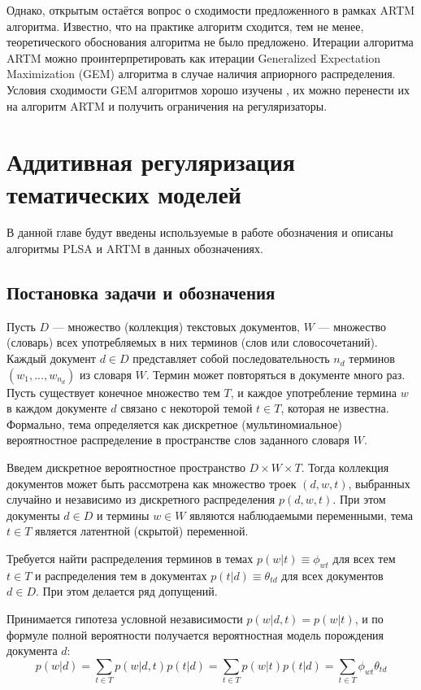 \documentclass[12pt, twoside]{article}
\begin{document}
Однако, открытым остаётся вопрос о сходимости предложенного в рамках ARTM алгоритма. Известно, что на практике алгоритм сходится, тем не менее, теоретического обоснования алгоритма не было предложено. Итерации алгоритма ARTM можно проинтерпретировать как итерации Generalized Expectation Maximization (GEM) алгоритма \cite{basegem} в случае наличия априорного распределения. Условия сходимости GEM алгоритмов хорошо изучены \cite{wuem}, их можно перенести их на алгоритм ARTM и получить ограничения на регуляризаторы.


\section{Аддитивная регуляризация тематических моделей}
В данной главе будут введены используемые в работе обозначения и описаны алгоритмы PLSA и ARTM в данных обозначениях.
\subsection{Постановка задачи и обозначения}
\label{subsec:denotes}
Пусть $D$ --- множество (коллекция) текстовых документов, $W$ --- множество (словарь) всех употребляемых в них терминов (слов или словосочетаний). Каждый документ $d \in D$ представляет собой последовательность $n_d$ терминов $(w_1, . . . , w_{n_d})$ из словаря $W$. Термин может повторяться в документе много раз. Пусть существует конечное множество тем $T$, и каждое употребление термина $w$ в каждом документе $d$ связано с некоторой темой $t \in T$, которая не известна. Формально, тема определяется как дискретное (мультиномиальное) вероятностное распределение в пространстве слов заданного словаря $W$.

Введем дискретное вероятностное пространство $D \times W \times T$. Тогда коллекция документов может быть рассмотрена как множество троек $(d, w, t)$, выбранных случайно и независимо из дискретного распределения $p(d, w, t)$. При этом документы $d \in D$ и термины $w \in W$ являются наблюдаемыми переменными, тема $t \in T$ является латентной (скрытой) переменной.

Требуется найти распределения терминов в темах $p(w|t) \equiv \phi_{wt}$ для всех тем $t \in T$ и распределения тем в документах $p(t|d) \equiv \theta_{td}$ для всех документов $d \in D$. При этом делается ряд допущений.

Принимается гипотеза условной независимости $p(w|d,t) = p(w|t)$, и  по формуле полной вероятности получается вероятностная модель порождения документа $d$:
\[
p(w|d) = \sum_{t \in T} p(w|d,t)p(t|d) = \sum_{t \in T}p(w|t)p(t|d)=\sum_{t \in T}\phi_{wt}\theta_{td}
\]
\end{document}
